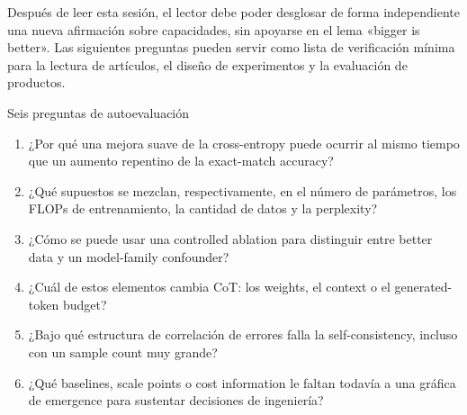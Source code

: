 \documentclass[a4paper]{article}
\begin{document}
Después de leer esta sesión, el lector debe poder desglosar de forma independiente una nueva afirmación sobre capacidades, sin apoyarse en el lema «bigger is better». Las siguientes preguntas pueden servir como lista de verificación mínima para la lectura de artículos, el diseño de experimentos y la evaluación de productos.

\begin{importantbox}{Seis preguntas de autoevaluación}
\begin{enumerate}
  \item ¿Por qué una mejora suave de la cross-entropy puede ocurrir al mismo tiempo que un aumento repentino de la exact-match accuracy?
  \item ¿Qué supuestos se mezclan, respectivamente, en el número de parámetros, los FLOPs de entrenamiento, la cantidad de datos y la perplexity?
  \item ¿Cómo se puede usar una controlled ablation para distinguir entre better data y un model-family confounder?
  \item ¿Cuál de estos elementos cambia CoT: los weights, el context o el generated-token budget?
  \item ¿Bajo qué estructura de correlación de errores falla la self-consistency, incluso con un sample count muy grande?
  \item ¿Qué baselines, scale points o cost information le faltan todavía a una gráfica de emergence para sustentar decisiones de ingeniería?
\end{enumerate}
\end{importantbox}
\end{document}
